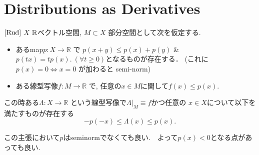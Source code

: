 

\section{Distributions as Derivatives}

\begin{tcolorbox}[mybox]
\begin{thm}{$\cite[Thm 3.2]{Rud}$}
\label{thm-H-2.3}
\(X\) $\mathbb{R}$ベクトル空間, \(M \subset X\) 部分空間として次を仮定する.
\begin{itemize}
\item あるmap\(p : X \to \mathbb{R}\) で
 \(p(x+y) \leq p(x)+p(y)\) \& \(p(tx) = t p(x).\ (\forall t \geq 0)\)となるものが存在する．
 (これに \(p(x)=0 \Leftrightarrow x=0\) が加わると semi-norm)
\item ある線型写像\(f : M \to \mathbb{R}\) で, 任意の\(x \in M\)に関して\(f(x) \leq p(x)\).
\end{itemize}
この時ある\(\Lambda : X \to \mathbb{R}\) という線型写像で\(\Lambda|_M \equiv f\)かつ任意の \(x \in X\)について以下を満たすものが存在する
\[
 -p(-x) \leq \Lambda(x) \leq p(x).
\]
\end{thm}
\end{tcolorbox}

この主張において$p$はseminormでなくても良い.　よって$p(x)<0$となる点があっても良い. 


